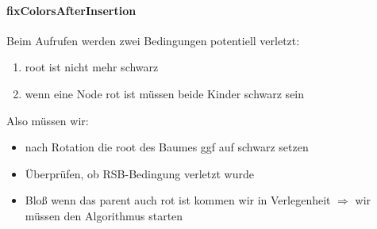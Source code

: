\documentclass[
    ngerman,
    color=3b,
    dark_mode,
    load_common, %
    summary,
    boxarc,
]{rubos-tuda-template}
\begin{document}
\paragraph{fixColorsAfterInsertion}
Beim Aufrufen werden zwei Bedingungen potentiell verletzt:
\begin{enumerate}
    \item root ist nicht mehr schwarz
    \item wenn eine Node rot ist müssen beide Kinder schwarz sein
\end{enumerate}
Also müssen wir:
\begin{itemize}
    \item nach Rotation die root des Baumes ggf auf schwarz setzen
    \item Überprüfen, ob RSB-Bedingung verletzt wurde
    \item Blo\ss{} wenn das parent auch rot ist kommen wir in Verlegenheit $\Longrightarrow$ wir müssen den Algorithmus starten
\end{itemize}
\end{document}
